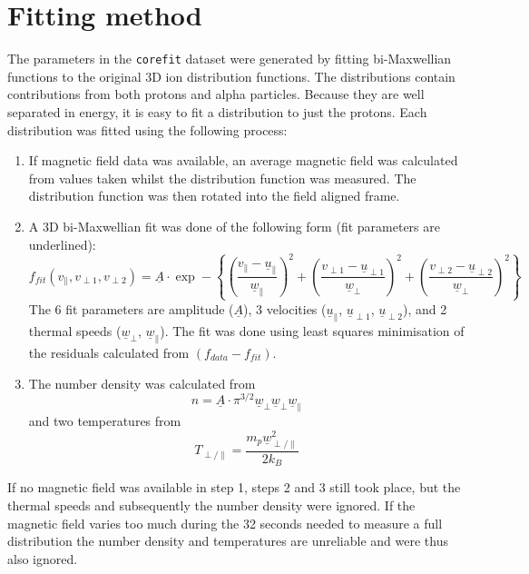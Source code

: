 \documentclass[11pt,a4paper]{article}
\begin{document}
\section{Fitting method}
The parameters in the \texttt{corefit} dataset were generated by fitting bi-Maxwellian functions to the original 3D ion distribution functions. The distributions contain contributions from both protons and alpha particles. Because they are well separated in energy, it is easy to fit a distribution to just the protons. Each distribution was fitted using the following process:
\begin{enumerate}
	\item If magnetic field data was available, an average magnetic field was calculated from values taken whilst the distribution function was measured. The distribution function was then rotated into the field aligned frame.
	\item A 3D bi-Maxwellian fit was done of the following form (fit parameters are underlined):
	\begin{equation}
		f_{fit} \left ( v_{\parallel}, v_{\perp 1}, v_{\perp 2} \right ) = \underline{A} \cdot \exp - \left \{ \left ( \frac{v_{\parallel} - \underline{u}_{\parallel}}{\underline{w}_{\parallel}} \right )^{2} + \left ( \frac{v_{\perp 1} - \underline{u}_{\perp 1}}{\underline{w}_{\perp}} \right )^{2} + \left ( \frac{v_{\perp 2} - \underline{u}_{\perp 2}}{\underline{w}_{\perp}} \right )^{2} \right \}
	\end{equation}
	The 6 fit parameters are amplitude ($\underline{A}$), 3 velocities ($\underline{u}_{\parallel}$, $\underline{u}_{\perp 1}$, $\underline{u}_{\perp 2}$), and 2 thermal speeds ($\underline{w}_{\perp}$, $\underline{w}_{\parallel}$). The fit was done using least squares minimisation of the residuals calculated from $\left (f_{data} - f_{fit}\right )$.
	\item The number density was calculated from
	\begin{equation}
		n = \underline{A} \cdot \pi^{3/2}\underline{w}_{\perp}\underline{w}_{\perp}\underline{w}_{\parallel}
	\end{equation}
	and two temperatures from
	\begin{equation}
		T_{\perp / \parallel} = \frac{m_{p}\underline{w}_{\perp / \parallel}^{2}}{2k_{B}}
	\end{equation}
\end{enumerate}
If no magnetic field was available in step 1, steps 2 and 3 still took place, but the thermal speeds and subsequently the number density were ignored. If the magnetic field varies too much during the 32 seconds needed to measure a full distribution the number density and temperatures are unreliable and were thus also ignored.
\end{document}
